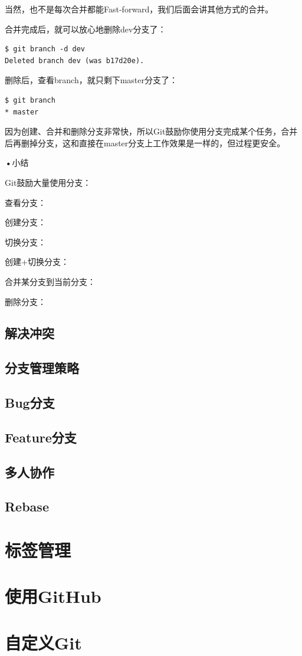 \documentclass[•]{article}
\begin{document}
\begin{CJK}{UTF8}{gbsn}
当然，也不是每次合并都能Fast-forward，我们后面会讲其他方式的合并。

合并完成后，就可以放心地删除dev分支了：
\begin{lstlisting}
$ git branch -d dev
Deleted branch dev (was b17d20e).
\end{lstlisting}
删除后，查看branch，就只剩下master分支了：
\begin{lstlisting}
$ git branch
* master
\end{lstlisting}
因为创建、合并和删除分支非常快，所以Git鼓励你使用分支完成某个任务，合并后再删掉分支，这和直接在master分支上工作效果是一样的，但过程更安全。

\textbf{•}{小结}

Git鼓励大量使用分支：

查看分支：

创建分支：

切换分支：

创建+切换分支：

合并某分支到当前分支：

删除分支：

\subsection{解决冲突}
\subsection{分支管理策略}
\subsection{Bug分支}
\subsection{Feature分支}
\subsection{多人协作}
\subsection{Rebase}
\section{标签管理}
\section{使用GitHub}
\section{自定义Git}
\end{CJK}
\end{document}
